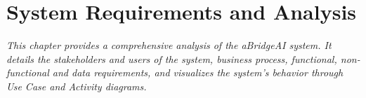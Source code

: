\section{System Requirements and Analysis}

\textit{This chapter provides a comprehensive analysis of the aBridgeAI system. It details the stakeholders and users of the system, business process, functional, non-functional and data requirements, and visualizes the system's behavior through Use Case and Activity diagrams.}